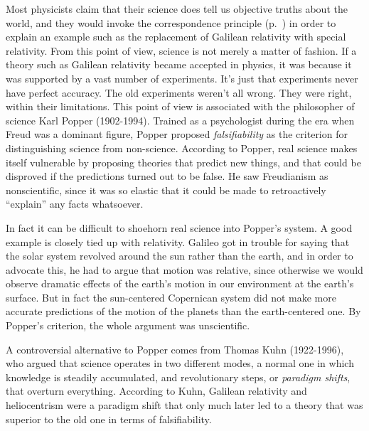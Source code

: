 Most physicists claim that their science does tell us objective truths about the world, and
they would invoke the correspondence principle (p.~\pageref{correspondence-principle-defined})
in order to explain an example such as the replacement of Galilean relativity with special relativity.
From this point of view, science is not merely a matter of fashion. If a theory such as Galilean relativity
became accepted in physics, it was because it was supported
by a vast number of experiments. It's just that experiments never have perfect
accuracy. The old experiments weren't all
wrong. They were right, within their limitations.
This point of view is associated with the philosopher of science Karl Popper (1902-1994). Trained as
a psychologist during the era when Freud was a dominant figure, Popper proposed \emph{falsifiability}
as the criterion for distinguishing science from non-science. According to Popper, real science makes
itself vulnerable by proposing theories that predict new things, and that could be disproved if the
predictions turned out to be false. He saw Freudianism as nonscientific, since it was so elastic that
it could be made to retroactively ``explain'' any facts whatsoever.

In fact it can be difficult to shoehorn real science into Popper's system. A good example is closely
tied up with relativity. Galileo got in trouble for saying that the solar system revolved around the
sun rather than the earth, and in order to advocate this, he had to argue that motion was relative,
since otherwise we would observe dramatic effects of the earth's motion in our environment at the earth's
surface. But in fact the sun-centered Copernican system did not make more accurate predictions
of the motion of the planets than the earth-centered one. By Popper's criterion, the whole argument was
unscientific.

A controversial alternative to Popper comes from Thomas Kuhn (1922-1996), who argued that
science operates in two different modes, a normal one in which knowledge is steadily accumulated,
and revolutionary steps, or \emph{paradigm shifts}, that overturn everything. According to Kuhn,
Galilean relativity and heliocentrism were a paradigm shift that only much later led to a theory
that was superior to the old one in terms of falsifiability.
